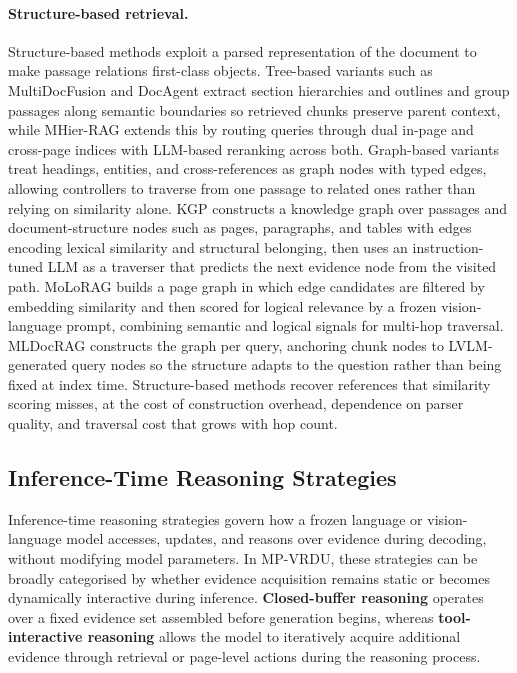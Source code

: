 \documentclass[11pt]{article}
\begin{document}
\paragraph{Structure-based retrieval.} Structure-based methods exploit a parsed representation of the document to make passage relations first-class objects. Tree-based variants such as MultiDocFusion \cite{shin2025multidocfusion} and DocAgent \cite{sun2025docagent} extract section hierarchies and outlines and group passages along semantic boundaries so retrieved chunks preserve parent context, while MHier-RAG \cite{gong2025mhierrag} extends this by routing queries through dual in-page and cross-page indices with LLM-based reranking across both. Graph-based variants treat headings, entities, and cross-references as graph nodes with typed edges, allowing controllers to traverse from one passage to related ones rather than relying on similarity alone. KGP \cite{wang2024knowledge} constructs a knowledge graph over passages and document-structure nodes such as pages, paragraphs, and tables with edges encoding lexical similarity and structural belonging, then uses an instruction-tuned LLM as a traverser that predicts the next evidence node from the visited path. MoLoRAG \cite{wu2025molorag} builds a page graph in which edge candidates are filtered by embedding similarity and then scored for logical relevance by a frozen vision-language prompt, combining semantic and logical signals for multi-hop traversal. MLDocRAG \cite{zhang2026mldocrag} constructs the graph per query, anchoring chunk nodes to LVLM-generated query nodes so the structure adapts to the question rather than being fixed at index time. Structure-based methods recover references that similarity scoring misses, at the cost of construction overhead, dependence on parser quality, and traversal cost that grows with hop count.

\subsection{Inference-Time Reasoning Strategies}
\label{sec:tf-reasoning}

Inference-time reasoning strategies govern how a frozen language or vision-language model accesses, updates, and reasons over evidence during decoding, without modifying model parameters. In MP-VRDU, these strategies can be broadly categorised by whether evidence acquisition remains static or becomes dynamically interactive during inference. \textbf{Closed-buffer reasoning} operates over a fixed evidence set assembled before generation begins, whereas \textbf{tool-interactive reasoning} allows the model to iteratively acquire additional evidence through retrieval or page-level actions during the reasoning process.
\end{document}
